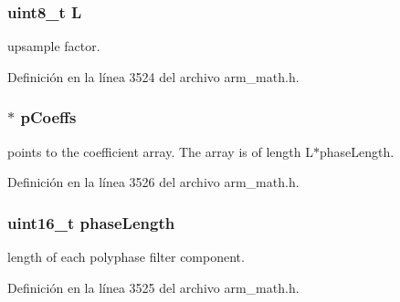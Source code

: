 \subsubsection[{\texorpdfstring{L}{L}}]{\setlength{\rightskip}{0pt plus 5cm}uint8\+\_\+t L}\hypertarget{structarm__fir__interpolate__instance__f32_aee73cc056696e504430c53eaa9c58cf0}{}\label{structarm__fir__interpolate__instance__f32_aee73cc056696e504430c53eaa9c58cf0}
upsample factor. 

Definición en la línea 3524 del archivo arm\+\_\+math.\+h.

\subsubsection[{\texorpdfstring{p\+Coeffs}{pCoeffs}}]{$\ast$ p\+Coeffs}\hypertarget{structarm__fir__interpolate__instance__f32_aacbb8dd8eeba4b21fc2bb40076405ee3}{}\label{structarm__fir__interpolate__instance__f32_aacbb8dd8eeba4b21fc2bb40076405ee3}
points to the coefficient array. The array is of length L$\ast$phase\+Length. 

Definición en la línea 3526 del archivo arm\+\_\+math.\+h.

\subsubsection[{\texorpdfstring{phase\+Length}{phaseLength}}]{\setlength{\rightskip}{0pt plus 5cm}uint16\+\_\+t phase\+Length}\hypertarget{structarm__fir__interpolate__instance__f32_a8f92bb07e0812f94679438cdf412b26a}{}\label{structarm__fir__interpolate__instance__f32_a8f92bb07e0812f94679438cdf412b26a}
length of each polyphase filter component. 

Definición en la línea 3525 del archivo arm\+\_\+math.\+h.

